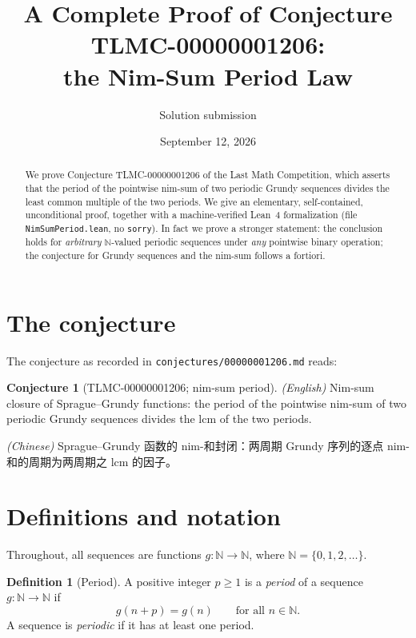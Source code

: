 \documentclass[11pt]{article}
\title{A Complete Proof of Conjecture \textup{TLMC-00000001206}:\\ the Nim-Sum Period Law}
\author{Solution submission}
\date{September 12, 2026}
\theoremstyle{definition}
\newtheorem{definition}[theorem]{Definition}
\newtheorem{conjecture}[theorem]{Conjecture}
\theoremstyle{remark}
\begin{document}
\maketitle

\begin{abstract}
We prove Conjecture \textup{TLMC-00000001206} of the Last Math Competition, which asserts that the period of the pointwise nim-sum of two periodic Grundy sequences divides the least common multiple of the two periods. We give an elementary, self-contained, unconditional proof, together with a machine-verified Lean~4 formalization (file \texttt{NimSumPeriod.lean}, no \texttt{sorry}). In fact we prove a stronger statement: the conclusion holds for \emph{arbitrary} $\mathbb{N}$-valued periodic sequences under \emph{any} pointwise binary operation; the conjecture for Grundy sequences and the nim-sum follows a fortiori.
\end{abstract}

\section{The conjecture}

The conjecture as recorded in \texttt{conjectures/00000001206.md} reads:

\begin{conjecture}[TLMC-00000001206; nim-sum period]\label{conj:main}
\emph{(English)} Nim-sum closure of Sprague--Grundy functions: the period of the pointwise nim-sum of two periodic Grundy sequences divides the lcm of the two periods.
\par\smallskip
\emph{(Chinese)} Sprague--Grundy 函数的 nim-和封闭：两周期 Grundy 序列的逐点 nim-和的周期为两周期之 lcm 的因子。
\end{conjecture}

\section{Definitions and notation}

Throughout, all sequences are functions $g \colon \mathbb{N} \to \mathbb{N}$, where $\mathbb{N} = \{0, 1, 2, \dots\}$.

\begin{definition}[Period]\label{def:period}
A positive integer $p \ge 1$ is a \emph{period} of a sequence $g \colon \mathbb{N} \to \mathbb{N}$ if
\[
g(n + p) = g(n) \qquad \text{for all } n \in \mathbb{N}.
\]
A sequence is \emph{periodic} if it has at least one period.
\end{definition}
\end{document}

